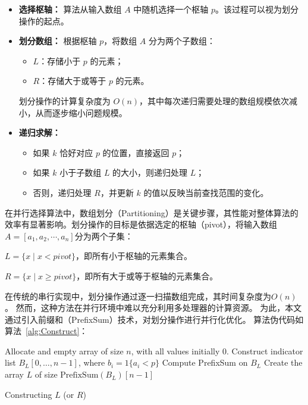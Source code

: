     \begin{itemize}
        \item \textbf{选择枢轴：}  
        算法从输入数组 $A$ 中随机选择一个枢轴 $p$。该过程可以视为划分操作的起点。
        
        \item \textbf{划分数组：}  
        根据枢轴 $p$，将数组 $A$ 分为两个子数组：
        \begin{itemize}
            \item $L$：存储小于 $p$ 的元素；
            \item $R$：存储大于或等于 $p$ 的元素。
        \end{itemize}
        划分操作的计算复杂度为 $O(n)$，其中每次递归需要处理的数组规模依次减小，从而逐步缩小问题规模。
    
        \item \textbf{递归求解：}  
        \begin{itemize}
            \item 如果 $k$ 恰好对应 $p$ 的位置，直接返回 $p$；
            \item 如果 $k$ 小于子数组 $L$ 的大小，则递归处理 $L$；
            \item 否则，递归处理 $R$，并更新 $k$ 的值以反映当前查找范围的变化。
        \end{itemize}
 
    \end{itemize}



    
    
    
    在并行选择算法中，数组划分（Partitioning）是关键步骤，其性能对整体算法的效率有显著影响。划分操作的目标是依据选定的枢轴（pivot），将输入数组\(A = [a_{1}, a_{2},\cdots, a_{n}]\)分为两个子集：

\(L = \{x \mid x < pivot\}\)，即所有小于枢轴的元素集合。

\(R = \{x \mid x \geq pivot\}\)，即所有大于或等于枢轴的元素集合。

在传统的串行实现中，划分操作通过逐一扫描数组完成，其时间复杂度为\(O(n)\)。
然而，这种方法在并行环境中难以充分利用多处理器的计算资源。
为此，本文通过引入前缀和（PrefixSum）技术，对划分操作进行并行化优化。
算法伪代码如算法~\ref{alg:Construct}：

\begin{algorithm}
    \SetAlgoLined
    Allocate and empty array of size $n$, with all values initially 0.\;
    Construct indicator list $B_L[0,\ldots,n - 1]$, where $b_i = 1\{a_i < p\}$\;
    Compute PrefixSum on $B_L$ %
    Create the array $L$ of size $\text{PrefixSum}(B_L)[n - 1]$ \;
    \caption{ Constructing $L$ (or $R$)}
    \label{alg:Construct}
  \end{algorithm}

